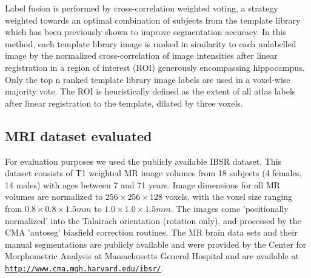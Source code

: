 \documentclass{article}\usepackage{graphicx, color}
\begin{document}
Label fusion is performed by cross-correlation weighted voting, a strategy
weighted towards an optimal combination of subjects from the template library
which has been previously shown to improve segmentation
accuracy\cite{Aljabar2009,Collins2010}. In this method, each template library
image is ranked in similarity to each unlabelled image by the normalized
cross-correlation of image intensities after linear registration in a region of
interest (ROI) generously encompassing hippocampus.  Only the top n ranked
template library image labels are used in a voxel-wise majority vote. The ROI
is heuristically defined as the extent of all atlas labels after linear
registration to the template, dilated by three voxels\cite{Chakravarty2012}.

\subsection{MRI dataset evaluated}

For evaluation purposes we used the publicly available IBSR dataset.  This
dataset consists of T1 weighted MR image volumes from 18 subjects (4 females,
14 males) with ages between 7 and 71 years. Image dimensions for all MR volumes
are normalized to  $256  \times 256 \times 128$ voxels, with the voxel size
ranging from $0.8 \times 0.8 \times 1.5 mm$ to $1.0 \times 1.0 \times 1.5 mm$.
The images come 'positionally normalized' into the Talairach orientation
(rotation only), and processed by the CMA 'autoseg' biasfield correction
routines. The MR brain data sets and their manual segmentations are publicly
available and were provided by the Center for Morphometric Analysis at
Massachusetts General Hospital and are available at
\href{http://www.cma.mgh.harvard.edu/ibsr/}
{\nolinkurl{http://www.cma.mgh.harvard.edu/ibsr/}}. 
\end{document}
